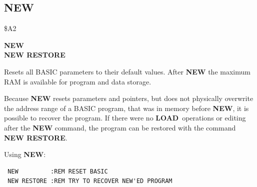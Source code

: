 \newpage
\subsection{NEW}
\begin{description}[leftmargin=2cm,style=nextline]
\item [Token:] \$A2
\item [Format:] {\bf NEW} \\
                {\bf NEW RESTORE}
\item [Usage:]  Resets all BASIC parameters
                to their default values.
                After {\bf NEW} the maximum RAM is available
                for program and data storage.

                Because {\bf NEW} resets parameters and pointers,
                but does not physically overwrite the address
                range of a BASIC program, that was in memory
                before {\bf NEW}, it is possible to recover the
                program. If there were no {\bf LOAD} operations
                or editing after the {\bf NEW} command, the program
                can be restored with the command \\
                {\bf NEW RESTORE}.
\item [Example:] Using {\bf NEW}:
\begin{tcolorbox}[colback=black,coltext=white]
\verbatimfont{\codefont}
\begin{verbatim}
 NEW         :REM RESET BASIC
 NEW RESTORE :REM TRY TO RECOVER NEW'ED PROGRAM
\end{verbatim}
\end{tcolorbox}
\end{description}


\newpage
